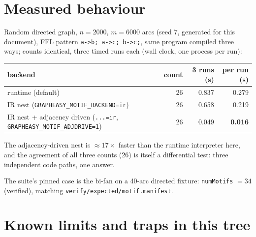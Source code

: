 \documentclass[11pt,a4paper]{article}
\newcommand{\code}[1]{\texttt{#1}}
\newcommand{\file}[1]{\texttt{#1}}
\begin{document}
\section{Measured behaviour}
\label{sec:measured}

Random directed graph, $n=2000$, $m=6000$ arcs (seed 7, generated for this
document), FFL pattern \code{a->b; a->c; b->c;}, same program compiled three ways;
counts identical, three timed runs each (wall clock, one process per run):

\begin{center}
\begin{tabular}{@{}lrrr@{}}
\toprule
backend & count & 3 runs (s) & per run (s) \\
\midrule
runtime (default) & 26 & 0.837 & 0.279 \\
IR nest (\code{GRAPHEASY\_MOTIF\_BACKEND=ir}) & 26 & 0.658 & 0.219 \\
IR nest + adjacency driven (\code{...=ir}, \code{GRAPHEASY\_MOTIF\_ADJDRIVE=1}) & 26 & 0.049 & \textbf{0.016} \\
\bottomrule
\end{tabular}
\end{center}

The adjacency-driven nest is $\approx17\times$ faster than the runtime
interpreter here, and the agreement of all three counts (26) is itself a
differential test: three independent code paths, one answer.

The suite's pinned case is the bi-fan on a 40-arc directed fixture:
\code{numMotifs} $=34$ (verified), matching
\file{verify/expected/motif.manifest}.

\section{Known limits and traps in this tree}
\label{sec:traps}
\end{document}
